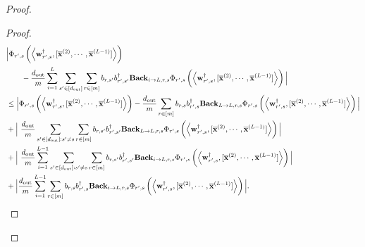 \begin{claim}
\begin{proof}
			\begin{proof}
				\begingroup \allowdisplaybreaks
				\begin{align*}
					&\Big| \Phi_{r', s} \left(\left\langle \mathbf{w}_{r', s}^{\dagger}, [\overline{\mathbf{x}}^{(2)}, \cdots, \overline{\mathbf{x}}^{(L-1)}]\right\rangle\right) \\& \quad \quad  - \frac{d_{\mathrm{out}} }{m} \sum_{i=1}^{L}  \sum_{s' \in [d_{\mathrm{out}} ]}  \sum_{r \in [m]}  b_{r, s'} b_{r', s'}^{\dagger} \mathbf{Back}_{i \to L, r, s} \Phi_{r', s} \left(\left\langle \mathbf{w}_{r', s}^{\dagger}, [\overline{\mathbf{x}}^{(2)}, \cdots, \overline{\mathbf{x}}^{(L-1)}]\right\rangle\right) \Big| \nonumber\\&
					\le 
					\Big| \Phi_{r', s} \left(\left\langle \mathbf{w}_{r', s}^{\dagger}, [\overline{\mathbf{x}}^{(2)}, \cdots, \overline{\mathbf{x}}^{(L-1)}]\right\rangle\right)  - \frac{d_{\mathrm{out}} }{m} \sum_{r \in [m]}  b_{r, s} b_{r', s}^{\dagger} \mathbf{Back}_{L \to L, r, s} \Phi_{r', s} \left(\left\langle \mathbf{w}_{r', s}^{\dagger}, [\overline{\mathbf{x}}^{(2)}, \cdots, \overline{\mathbf{x}}^{(L-1)}]\right\rangle\right) \Big| \\&
					+ \Big| \ \frac{d_{\mathrm{out}} }{m} \sum_{s'\in [d_{\mathrm{out}} ]: s' \ne s} \sum_{r \in [m]}  b_{r, s'} b_{r', s'}^{\dagger} \mathbf{Back}_{L \to L, r, s} \Phi_{r', s} \left(\left\langle \mathbf{w}_{r', s}^{\dagger}, [\overline{\mathbf{x}}^{(2)}, \cdots, \overline{\mathbf{x}}^{(L-1)}]\right\rangle\right) \Big| \\&
					+ \Big| \ \frac{d_{\mathrm{out}} }{m}  \sum_{i=1}^{L-1} \sum_{s'\in [d_{\mathrm{out}} ]: s' \ne s} \sum_{r \in [m]}  b_{r, s'} b_{r', s'}^{\dagger} \mathbf{Back}_{i \to L, r, s} \Phi_{r', s} \left(\left\langle \mathbf{w}_{r', s}^{\dagger}, [\overline{\mathbf{x}}^{(2)}, \cdots, \overline{\mathbf{x}}^{(L-1)}]\right\rangle\right) \Big| \\&
					+ \Big|  \frac{d_{\mathrm{out}} }{m} \sum_{i=1}^{L-1} \sum_{r \in [m]}  b_{r, s} b_{r', s}^{\dagger} \mathbf{Back}_{i \to L, r, s} \Phi_{r', s} \left(\left\langle \mathbf{w}_{r', s}^{\dagger}, [\overline{\mathbf{x}}^{(2)}, \cdots, \overline{\mathbf{x}}^{(L-1)}]\right\rangle\right) \Big|.
				\end{align*}
				\endgroup
				

\end{proof}
\end{proof}
\end{claim}
